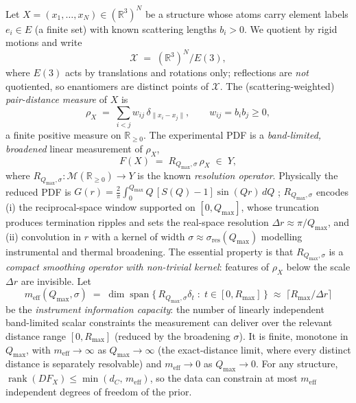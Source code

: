 \documentclass[11pt]{article}
\begin{document}
Let $X=(x_1,\dots,x_N)\in(\mathbb{R}^3)^N$ be a structure whose atoms carry
element labels $e_i\in E$ (a finite set) with known scattering lengths
$b_i>0$. We quotient by rigid motions and write
\[
  \mathcal{X} \;=\; (\mathbb{R}^3)^N / E(3),
\]
where $E(3)$ acts by translations and rotations only; reflections are
\emph{not} quotiented, so enantiomers are distinct points of $\mathcal{X}$.
The (scattering-weighted) \emph{pair-distance measure} of $X$ is
\[
  \rho_X \;=\; \sum_{i<j} w_{ij}\,\delta_{\|x_i-x_j\|},
  \qquad w_{ij}=b_i b_j\ge 0,
\]
a finite positive measure on $\mathbb{R}_{\ge 0}$. The experimental PDF is a
\emph{band-limited, broadened} linear measurement of $\rho_X$,
\[
  F(X) \;=\; R_{Q_{\max},\sigma}\,\rho_X \;\in\; Y,
\]
where $R_{Q_{\max},\sigma}: \mathcal{M}(\mathbb{R}_{\ge 0})\to Y$ is the known
\emph{resolution operator}. Physically the reduced PDF is
$G(r)=\tfrac{2}{\pi}\int_0^{Q_{\max}} Q\,[S(Q)-1]\sin(Qr)\,dQ$
\cite{Billinge2004}; $R_{Q_{\max},\sigma}$ encodes (i) the reciprocal-space
window supported on $[0,Q_{\max}]$, whose truncation produces termination
ripples and sets the real-space resolution $\Delta r\approx\pi/Q_{\max}$, and
(ii) convolution in $r$ with a kernel of width $\sigma\approx\sigma_{\mathrm{res}}(Q_{\max})$
modelling instrumental and thermal broadening. The essential property is that
$R_{Q_{\max},\sigma}$ is a \emph{compact smoothing operator with non-trivial
kernel}: features of $\rho_X$ below the scale $\Delta r$ are invisible. Let
\[
  m_{\mathrm{eff}}(Q_{\max},\sigma)
  \;=\; \dim \operatorname{span}\bigl\{\, R_{Q_{\max},\sigma}\delta_t
  \;:\; t\in[0,R_{\max}] \,\bigr\}
  \;\approx\; \bigl\lceil R_{\max}/\Delta r \bigr\rceil
\]
be the \emph{instrument information capacity}: the number of linearly
independent band-limited scalar constraints the measurement can deliver over
the relevant distance range $[0,R_{\max}]$ (reduced by the broadening
$\sigma$). It is finite, monotone in $Q_{\max}$, with
$m_{\mathrm{eff}}\to\infty$ as $Q_{\max}\to\infty$ (the exact-distance limit,
where every distinct distance is separately resolvable) and
$m_{\mathrm{eff}}\to 0$ as $Q_{\max}\to 0$. For any structure,
$\operatorname{rank}(DF_X)\le \min(d_C,\,m_{\mathrm{eff}})$, so the data can
constrain at most $m_{\mathrm{eff}}$ independent degrees of freedom of the
prior.
\end{document}
